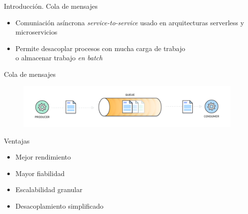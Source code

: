 \documentclass{beamer}
\begin{document}
  \begin{frame}{Introducción. Cola de mensajes}
    \begin{itemize}
      \item Comuniación asíncrona \textit{service-to-service}
      usado en arquitecturas serverless y microservicios
      \item Permite desacoplar procesos con mucha carga de trabajo\\
      o almacenar trabajo \textit{en batch}
    \end{itemize}
  \end{frame}

  \begin{frame}{Cola de mensajes}
    \begin{figure}
      \includegraphics[width=\textwidth]{msg_queue.png}
    \end{figure}
  \end{frame}

  \begin{frame}{Ventajas}
    \begin{itemize}
      \item Mejor rendimiento
      \item Mayor fiabilidad
      \item Escalabilidad granular
      \item Desacoplamiento simplificado
    \end{itemize}
  \end{frame}
\end{document}
